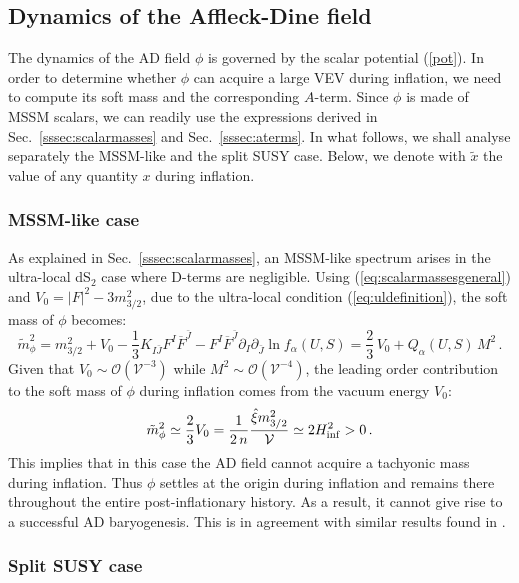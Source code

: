 \documentclass[11pt,a4paper]{article}
\newcommand{\be}{\begin{equation}}
\newcommand{\ee}{\end{equation}}
\newcommand\vo{{\mathcal{V}}}
\newcommand{\mc}{\mathcal}
\begin{document}
\subsection{Dynamics of the Affleck-Dine field}
\label{ssec:ADBdynamics}

The dynamics of the AD field $\phi$ is governed by the scalar potential (\ref{pot}). In order to determine whether $\phi$ can acquire a large VEV during inflation, we need to compute its soft mass and the corresponding $A$-term. Since $\phi$ is made of MSSM scalars, we can readily use the expressions derived in Sec.~\ref{sssec:scalarmasses} and Sec.~\ref{sssec:aterms}. In what follows, we shall analyse separately the MSSM-like and the split SUSY case. Below, we denote with $\tilde{x}$ the value of any quantity $x$ during inflation. 

\subsubsection{MSSM-like case}
\label{sssec:ADdynamicsMSSM}

As explained in Sec.~\ref{sssec:scalarmasses}, an MSSM-like spectrum arises in the ultra-local dS$_2$ case where D-terms are negligible. Using (\ref{eq:scalarmassesgeneral}) and $V_0 = |F|^2 - 3 m_{3/2}^2$, due to the ultra-local condition (\ref{eq:uldefinition}), the soft mass of $\phi$ becomes:
\be
\tilde{m}_\phi^2 = m_{3/2}^2 + V_0 - \frac{1}{3} K_{I\bar{J}} F^I \overline{F}^{\bar{J}} -  F^I \overline{F}^{\bar{J}} \partial_I \partial_{\bar{J}} \ln f_\alpha(U,S) = \frac 23 \,V_0 + Q_\alpha(U,S) \,M^2\,.
\ee
Given that $V_0 \sim \mc{O}\left(\vo^{-3}\right)$ while $M^2\sim\mc{O}\left(\vo^{-4}\right)$, the leading order contribution to the soft mass of $\phi$ during inflation comes from the vacuum energy $V_0$: 
\be
\tilde{m}^2_\phi \simeq \frac 23 V_0 =  \frac{1}{2\,n} \frac{\hat{\xi} m_{3/2}^2}{\vo} \simeq 2 H^2_{\rm inf}> 0\,.
\label{mphiUL}
\ee
This implies that in this case the AD field cannot acquire a tachyonic mass during inflation. Thus $\phi$ settles at the origin during inflation and remains there throughout the entire post-inflationary history. As a result, it cannot give rise to a successful AD baryogenesis. This is in agreement with similar results found in \cite{Casas:1997uk, Dutta:2010sg, Marsh:2011ud}.

\subsubsection{Split SUSY case}
\label{sssec:ADdynamicssplitsusy}
\end{document}
